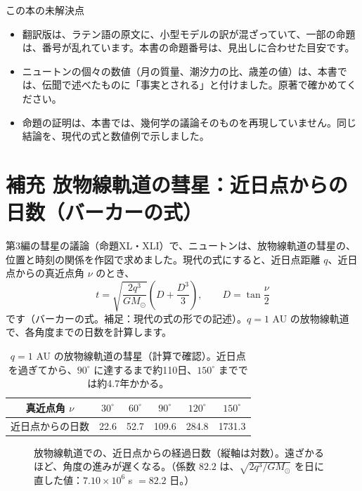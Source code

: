 \documentclass[a4paper,11pt,openany]{ltjsbook}
\begin{document}
\begin{notebox}{この本の未解決点}
\begin{itemize}[leftmargin=1.5em]
\item 翻訳版は、ラテン語の原文に、小型モデルの訳が混ざっていて、一部の命題は、番号が乱れています。本書の命題番号は、見出しに合わせた目安です。
\item ニュートンの個々の数値（月の質量、潮汐力の比、歳差の値）は、本書では、伝聞で述べたものに「事実とされる」と付けました。原著で確かめてください。
\item 命題の証明は、本書では、幾何学の議論そのものを再現していません。同じ結論を、現代の式と数値例で示しました。
\end{itemize}
\end{notebox}

\section{補充 放物線軌道の彗星：近日点からの日数（バーカーの式）}

第3編の彗星の議論（命題XL・XLI）で、ニュートンは、放物線軌道の彗星の、位置と時刻の関係を作図で求めました。現代の式にすると、近日点距離 $q$、近日点からの真近点角 $\nu$ のとき、
\[
t=\sqrt{\frac{2q^3}{GM_\odot}}\left(D+\frac{D^3}{3}\right),\qquad D=\tan\frac\nu2
\]
です（バーカーの式。補足：現代の式の形での記述）。$q=1$ AU の放物線軌道で、各角度までの日数を計算します。

\begin{table}[htbp]
\centering
\begin{tabular}{c|ccccc}
\toprule
真近点角 $\nu$ & $30^\circ$ & $60^\circ$ & $90^\circ$ & $120^\circ$ & $150^\circ$\\
\midrule
近日点からの日数 & 22.6 & 52.7 & 109.6 & 284.8 & 1731.3\\
\bottomrule
\end{tabular}
\caption{$q=1$ AU の放物線軌道の彗星（計算で確認）。近日点を過ぎてから、$90^\circ$ に達するまで約110日、$150^\circ$ まででは約4.7年かかる。}
\end{table}

\begin{figure}[htbp]
\centering
{}
\caption{放物線軌道での、近日点からの経過日数（縦軸は対数）。遠ざかるほど、角度の進みが遅くなる。（係数 $82.2$ は、$\sqrt{2q^3/GM_\odot}$ を日に直した値：$7.10\times10^6$ s $=82.2$ 日。）}
\end{figure}
\end{document}
